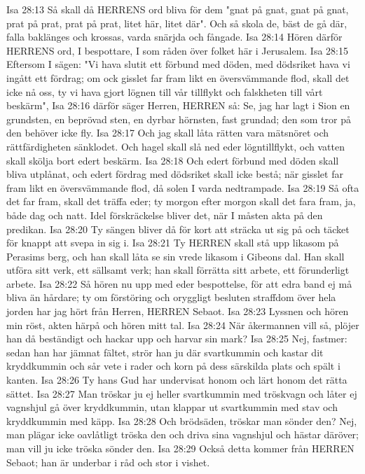 Isa 28:13  Så skall då HERRENS ord bliva för dem "gnat på gnat, gnat på gnat, prat på prat, prat på prat, litet här, litet där". Och så skola de, bäst de gå där, falla baklänges och krossas, varda snärjda och fångade.
Isa 28:14  Hören därför HERRENS ord, I bespottare, I som råden över folket här i Jerusalem.
Isa 28:15  Eftersom I sägen: "Vi hava slutit ett förbund med döden, med dödsriket hava vi ingått ett fördrag; om ock gisslet far fram likt en översvämmande flod, skall det icke nå oss, ty vi hava gjort lögnen till vår tillflykt och falskheten till vårt beskärm",
Isa 28:16  därför säger Herren, HERREN så: Se, jag har lagt i Sion en grundsten, en beprövad sten, en dyrbar hörnsten, fast grundad; den som tror på den behöver icke fly.
Isa 28:17  Och jag skall låta rätten vara mätsnöret och rättfärdigheten sänklodet. Och hagel skall slå ned eder lögntillflykt, och vatten skall skölja bort edert beskärm.
Isa 28:18  Och edert förbund med döden skall bliva utplånat, och edert fördrag med dödsriket skall icke bestå; när gisslet far fram likt en översvämmande flod, då solen I varda nedtrampade.
Isa 28:19  Så ofta det far fram, skall det träffa eder; ty morgon efter morgon skall det fara fram, ja, både dag och natt. Idel förskräckelse bliver det, när I måsten akta på den predikan.
Isa 28:20  Ty sängen bliver då för kort att sträcka ut sig på och täcket för knappt att svepa in sig i.
Isa 28:21  Ty HERREN skall stå upp likasom på Perasims berg, och han skall låta se sin vrede likasom i Gibeons dal. Han skall utföra sitt verk, ett sällsamt verk; han skall förrätta sitt arbete, ett förunderligt arbete.
Isa 28:22  Så hören nu upp med eder bespottelse, för att edra band ej må bliva än hårdare; ty om förstöring och oryggligt besluten straffdom över hela jorden har jag hört från Herren, HERREN Sebaot.
Isa 28:23  Lyssnen och hören min röst, akten härpå och hören mitt tal.
Isa 28:24  När åkermannen vill så, plöjer han då beständigt och hackar upp och harvar sin mark?
Isa 28:25  Nej, fastmer: sedan han har jämnat fältet, strör han ju där svartkummin och kastar dit kryddkummin och sår vete i rader och korn på dess särskilda plats och spält i kanten.
Isa 28:26  Ty hans Gud har undervisat honom och lärt honom det rätta sättet.
Isa 28:27  Man tröskar ju ej heller svartkummin med tröskvagn och låter ej vagnshjul gå över kryddkummin, utan klappar ut svartkummin med stav och kryddkummin med käpp.
Isa 28:28  Och brödsäden, tröskar man sönder den? Nej, man plägar icke oavlåtligt tröska den och driva sina vagnshjul och hästar däröver; man vill ju icke tröska sönder den.
Isa 28:29  Också detta kommer från HERREN Sebaot; han är underbar i råd och stor i vishet.
